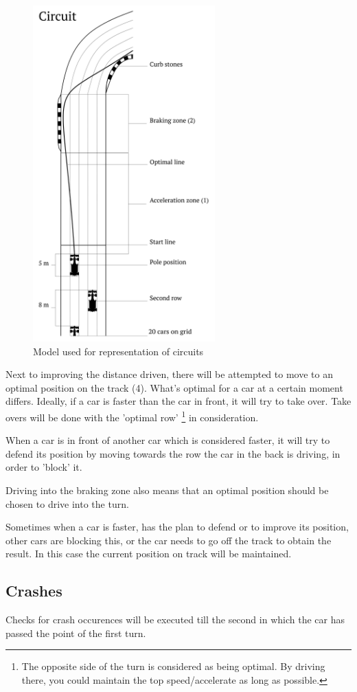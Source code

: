 \begin{figure}[H]
\includegraphics[width=7cm]{f1start-01}
\caption{Model used for representation of circuits}
\end{figure}

Next to improving the distance driven, there will be attempted to move to an optimal position on the track (4). What's optimal for a car at a certain moment differs. Ideally, if a car is faster than the car in front, it will try to take over. Take overs will be done with the 'optimal row' \footnote{The opposite side of the turn is considered as being optimal. By driving there, you could maintain the top speed/accelerate as long as possible.} in consideration.

When a car is in front of another car which is considered faster, it will try to defend its position by moving towards the row the car in the back is driving, in order to 'block' it.

Driving into the braking zone also means that an optimal position should be chosen to drive into the turn.

Sometimes when a car is faster, has the plan to defend or to improve its position, other cars are blocking this, or the car needs to go off the track to obtain the result. In this case the current position on track will be maintained.

\subsection{Crashes}
Checks for crash occurences will be executed till the second in which the car has passed the point of the first turn.


